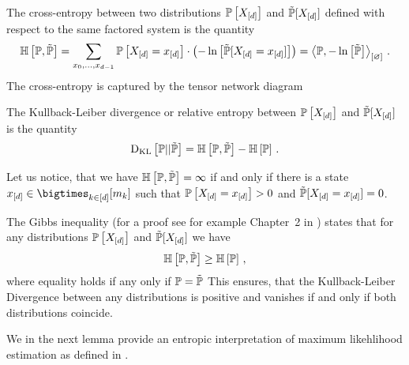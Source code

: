 \begin{definition}
    \label{def:crossEntropy}
    The cross-entropy between two distributions $\mathbb{P}\left[X_{[d]}\right]$ and $\tilde{\mathbb{P}}[X_{[d]}]$ defined with respect to the same factored system is the quantity
    \begin{align*}
        \mathbb{H}\left[\mathbb{P},\tilde{\mathbb{P}}\right]
        = \sum_{x_{0},\ldots,x_{d-1}}  \mathbb{P}\left[X_{[d]}=x_{[d]}\right] \cdot \left(-\ln \left[ \tilde{\mathbb{P}}[X_{[d]}=x_{[d]}] \right]\right)
        = \left\langle \mathbb{P},-\ln \left[ \tilde{\mathbb{P}} \right]\right\rangle_{\left[ \varnothing \right]} \, .
    \end{align*}
    The cross-entropy is captured by the tensor network diagram
    \begin{center}
        
    \end{center}
    The Kullback-Leiber divergence or relative entropy between $\mathbb{P}\left[X_{[d]}\right]$ and $\tilde{\mathbb{P}}[X_{[d]}]$ is the quantity
    \begin{align*}
        \mathrm{D}_{\mathrm{KL}}\left[ \mathbb{P} || \tilde{\mathbb{P}} \right] = \mathbb{H}\left[\mathbb{P},\tilde{\mathbb{P}}\right] - \mathbb{H}\left[\mathbb{P}\right]  \, .
    \end{align*}
\end{definition}

Let us notice, that we have $\mathbb{H}\left[\mathbb{P},\tilde{\mathbb{P}}\right] = \infty$ if and only if there is a state $\shortcatindicesin$ such that $\mathbb{P}\left[X_{[d]}=x_{[d]}\right]>0$ and $\tilde{\mathbb{P}}[X_{[d]}=x_{[d]}]=0$.

The Gibbs inequality (for a proof see for example Chapter~2 in \cite{cover_elements_2006}) states that for any distributions $\mathbb{P}\left[X_{[d]}\right]$ and $\tilde{\mathbb{P}}[X_{[d]}]$ we have
\begin{align*}
    \mathbb{H}\left[\mathbb{P},\tilde{\mathbb{P}}\right] \geq \mathbb{H}\left[\mathbb{P}\right] \, ,
\end{align*}
where equality holds if any only if $\mathbb{P}=\tilde{\mathbb{P}}$
This ensures, that the Kullback-Leiber Divergence between any distributions is positive and vanishes if and only if both distributions coincide.

We in the next lemma provide an entropic interpretation of maximum likehlihood estimation as defined in .

